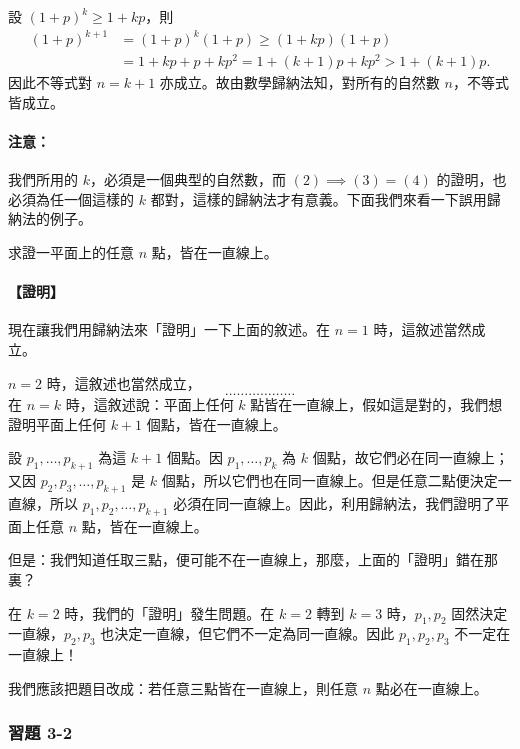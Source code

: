 設 $(1+p)^k \ge 1+kp$，則
\begin{align*}
  (1+p)^{k+1} &= (1+p)^k (1+p) \ge (1+kp)(1+p) \\
  &= 1 + kp + p + kp^2 = 1 + (k+1)p + kp^2 > 1 + (k+1)p.
\end{align*}
因此不等式對 $n=k+1$ 亦成立。故由數學歸納法知，對所有的自然數 $n$，不等式皆成立。

\paragraph{注意：}我們所用的 $k$，必須是一個典型的自然數，而 $(2) \implies (3)=(4)$ 的證明，也必須為任一個這樣的 $k$ 都對，這樣的歸納法才有意義。下面我們來看一下誤用歸納法的例子。

\begin{example}\label{ex:b1-3-2b}
求證一平面上的任意 $n$ 點，皆在一直線上。
\end{example}

\paragraph{【證明】}現在讓我們用歸納法來「證明」一下上面的敘述。在 $n=1$ 時，這敘述當然成立。

$n=2$ 時，這敘述也當然成立，
\[
  \dots\dots\dots\dots\dots\dots
\]
在 $n=k$ 時，這敘述說：平面上任何 $k$ 點皆在一直線上，假如這是對的，我們想證明平面上任何 $k+1$ 個點，皆在一直線上。

設 $p_1, \dots, p_{k+1}$ 為這 $k+1$ 個點。因 $p_1, \dots, p_k$ 為 $k$ 個點，故它們必在同一直線上；又因 $p_2, p_3, \dots, p_{k+1}$ 是 $k$ 個點，所以它們也在同一直線上。但是任意二點便決定一直線，所以 $p_1, p_2, \dots, p_{k+1}$ 必須在同一直線上。因此，利用歸納法，我們證明了平面上任意 $n$ 點，皆在一直線上。

但是：我們知道任取三點，便可能不在一直線上，那麼，上面的「證明」錯在那裏？

在 $k=2$ 時，我們的「證明」發生問題。在 $k=2$ 轉到 $k=3$ 時，$p_1, p_2$ 固然決定一直線，$p_2, p_3$ 也決定一直線，但它們不一定為同一直線。因此 $p_1, p_2, p_3$ 不一定在一直線上！

我們應該把題目改成：若任意三點皆在一直線上，則任意 $n$ 點必在一直線上。

\subsubsection*{習題 3-2}\label{sec:ex3-2}

